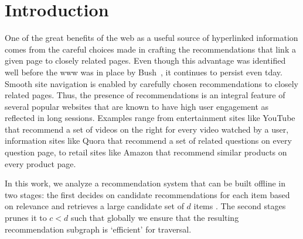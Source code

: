 
\section{Introduction}

One of the great benefits of the web as a useful source of hyperlinked
information comes from the careful choices made in crafting the recommendations
that link a given page to closely related pages. Even though this advantage was
identified well before the www was in place by Bush~\cite{Bush45}, it continues
to persist even tday. Smooth site navigation is enabled by carefully chosen
recommendations to closely related pages. Thus, the presence of recommendations
is an integral feature of several popular websites that are known to have high
user engagement as reflected in long sessions. Examples range from 
entertainment sites like YouTube that recommend a set of videos on the right
for every video watched by a user, information sites like Quora that recommend
a set of related questions on every question page, to retail sites like Amazon
that recommend similar products on every product page. \vs


In this work, we analyze a recommendation system that can be built
offline in two stages: the first decides on candidate recommendations
for each item based on relevance and retrieves a large candidate set
of $d$ items \cite{Schafer1999, Adomavicius2005, Resnick1997}. The
second stages prunes it to $c < d$ such that globally we ensure that
the resulting recommendation subgraph is `efficient' for traversal. 


